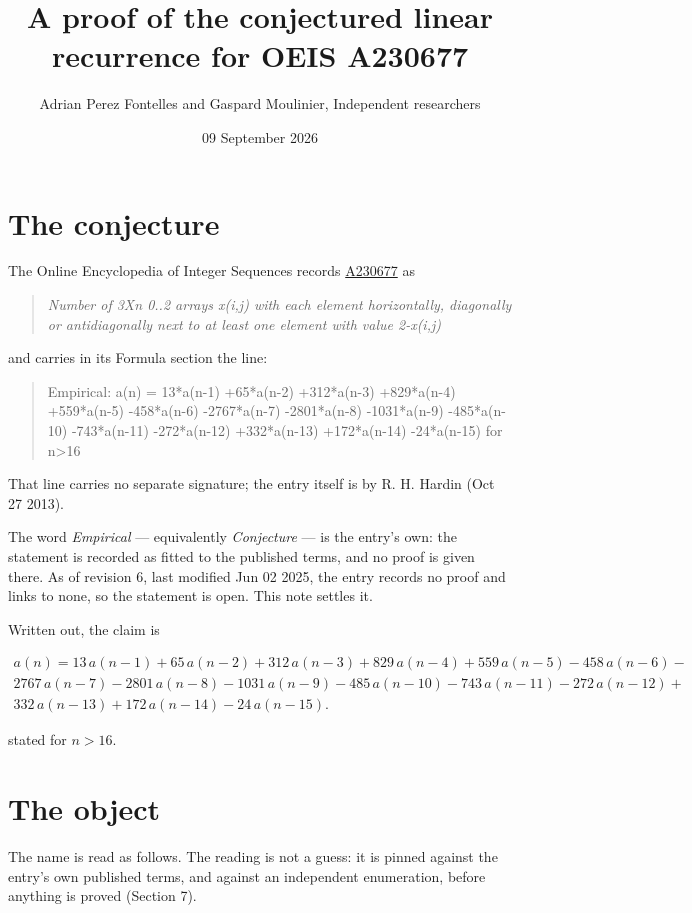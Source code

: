 \documentclass[11pt]{article}
\title{A proof of the conjectured linear recurrence for OEIS A230677}
\author{Adrian Perez Fontelles and Gaspard Moulinier, Independent researchers}
\date{09 September 2026}
\theoremstyle{definition}
\begin{document}
\maketitle
\section{The conjecture}

The Online Encyclopedia of Integer Sequences records \href{https://oeis.org/A230677}{A230677} as

\begin{quote}\itshape Number of 3Xn 0..2 arrays x(i,j) with each element horizontally, diagonally or antidiagonally next to at least one element with value 2-x(i,j)\end{quote}

and carries in its Formula section the line:

\begin{quote}\ttfamily Empirical: a(n) = 13*a(n-1) +65*a(n-2) +312*a(n-3) +829*a(n-4) +559*a(n-5) -458*a(n-6) -2767*a(n-7) -2801*a(n-8) -1031*a(n-9) -485*a(n-10) -743*a(n-11) -272*a(n-12) +332*a(n-13) +172*a(n-14) -24*a(n-15) for n>16\end{quote}

That line carries no separate signature; the entry itself is by R. H. Hardin (Oct 27 2013).

The word {\itshape Empirical} --- equivalently {\itshape Conjecture} --- is the entry's own: the statement is recorded as fitted to the published terms, and no proof is given there. As of revision 6, last modified Jun 02 2025, the entry records no proof and links to none, so the statement is open. This note settles it.

Written out, the claim is

\begin{multline*} a(n) = 13\,a(n-1) + 65\,a(n-2) + 312\,a(n-3) + 829\,a(n-4) + 559\,a(n-5) - 458\,a(n-6) - \\ 2767\,a(n-7) - 2801\,a(n-8) - 1031\,a(n-9) - 485\,a(n-10) - 743\,a(n-11) - 272\,a(n-12) + \\ 332\,a(n-13) + 172\,a(n-14) - 24\,a(n-15). \end{multline*}

stated for $n > 16$.

\section{The object}

The name is read as follows. The reading is not a guess: it is pinned against the entry's own published terms, and against an independent enumeration, before anything is proved (Section 7).
\end{document}
